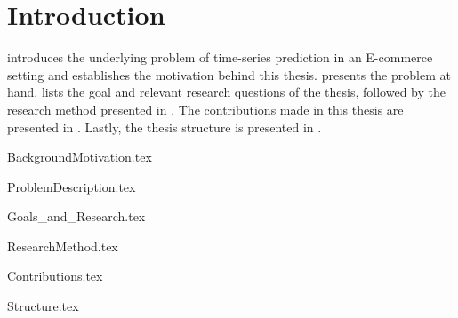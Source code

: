 \chapter{Introduction}
\label{cha:Introduction}

introduces the underlying problem of time-series prediction in an E-commerce setting and establishes the motivation behind this thesis.
 presents the problem at hand.
 lists the goal and relevant research questions of the thesis,
followed by the research method presented in .
The contributions made in this thesis are presented in .
Lastly, the thesis structure is presented in .



{BackgroundMotivation.tex}

{ProblemDescription.tex}

{Goals_and_Research.tex}

{ResearchMethod.tex}

{Contributions.tex}

{Structure.tex}
